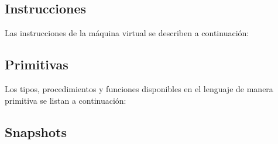\documentclass{article}
\begin{document}
\subsection{Instrucciones}

Las instrucciones de la m\'aquina virtual se describen a continuaci\'on:



\subsection{Primitivas}

Los tipos, procedimientos y funciones disponibles en el lenguaje de manera primitiva se listan a continuaci\'on:



\subsection{Snapshots}
\end{document}
